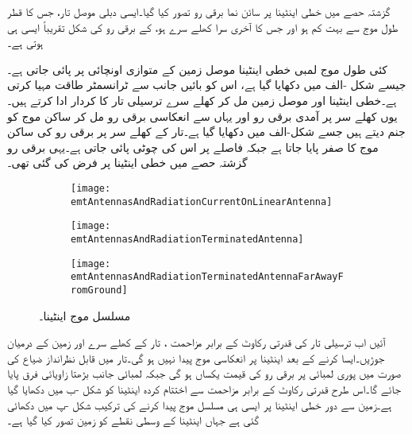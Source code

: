 گزشتہ حصے میں خطی اینٹینا پر سائن نما برقی رو تصور کیا گیا۔ایسی دبلی موصل تار، جس کا قطر  طول موج  سے بہت کم ہو  اور جس کا آخری سرا کھلے سرے ہو، کے برقی رو کی شکل تقریباً ایسی ہی ہوتی ہے۔

کئی طول موج لمبی خطی اینٹینا موصل زمین کے متوازی  اونچائی پر پائی جاتی ہے۔ جیسے شکل -الف میں دکھایا گیا ہے، اس کو بائیں جانب سے ٹرانسمٹر طاقت مہیا کرتی ہے۔خطی اینٹینا اور موصل زمین مل کر کھلے سرے ترسیلی تار کا کردار ادا کرتے ہیں۔یوں کھلے سر پر آمدی برقی رو اور یہاں سے انعکاسی برقی رو مل کر ساکن موج کو جنم دیتے ہیں جسے شکل-الف میں دکھایا گیا ہے۔تار کے کھلے سر پر برقی رو کی ساکن موج کا صفر پایا جاتا ہے جبکہ   فاصلے پر اس کی چوٹی پائی جاتی ہے۔یہی برقی رو گزشتہ حصے میں خطی اینٹینا پر فرض کی گئی تھی۔

\begin{figure}
\centering
\begin{subfigure}{1\textwidth}
\centering
\texttt{[image: emtAntennasAndRadiationCurrentOnLinearAntenna]}
\end{subfigure}
\par\bigskip
\begin{subfigure}{1\textwidth}
\centering
\texttt{[image: emtAntennasAndRadiationTerminatedAntenna]}
\end{subfigure}
\par\bigskip
\begin{subfigure}{1\textwidth}
\centering
\texttt{[image: emtAntennasAndRadiationTerminatedAntennaFarAwayFromGround]}
\end{subfigure}
\caption{مسلسل موج اینٹینا۔}
\label{شکل_اینٹینا_موصل_سطح_خطی_اینٹینا_رو}
\end{figure}

آئیں اب ترسیلی تار کی قدرتی رکاوٹ کے برابر مزاحمت ،  تار کے کھلے سرے اور زمین کے درمیان جوڑیں۔ایسا کرنے کے بعد اینٹینا پر انعکاسی موج پیدا نہیں ہو گی۔تار میں قابل نظرانداز ضیاع کی صورت میں پوری لمبائی پر برقی رو کی قیمت یکساں ہو گی جبکہ لمبائی جانب بڑھتا زاویائی فرق پایا جائے گا۔اس طرح قدرتی رکاوٹ کے برابر مزاحمت سے اختتام کردہ اینٹینا کو شکل -ب میں دکھایا گیا ہے۔زمین سے دور خطی اینٹینا پر ایسی ہی مسلسل موج پیدا کرنے کی ترکیب شکل -پ میں دکھائی گئی ہے جہاں  اینٹینا کے وسطی نقطے کو زمین تصور کیا گیا ہے۔

